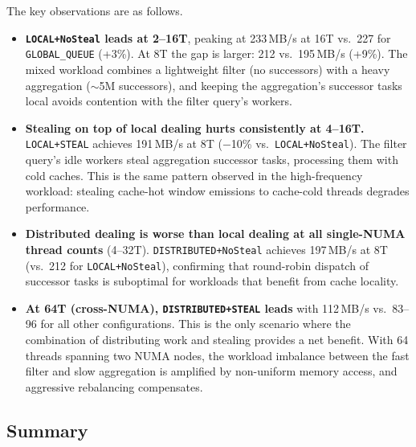 The key observations are as follows.
%
\begin{itemize}
    \item \textbf{\texttt{LOCAL+NoSteal} leads at 2--16T}, peaking at 233\,MB/s at 16T vs.\ 227 for \texttt{GLOBAL\_QUEUE} (+3\%).
    At 8T the gap is larger: 212 vs.\ 195\,MB/s (+9\%).
    The mixed workload combines a lightweight filter (no successors) with a heavy aggregation ($\sim$5M successors), and keeping the aggregation's successor tasks local avoids contention with the filter query's workers.

    \item \textbf{Stealing on top of local dealing hurts consistently at 4--16T.}
    \texttt{LOCAL+STEAL} achieves 191\,MB/s at 8T ($-$10\% vs.\ \texttt{LOCAL+NoSteal}).
    The filter query's idle workers steal aggregation successor tasks, processing them with cold caches.
    This is the same pattern observed in the high-frequency workload: stealing cache-hot window emissions to cache-cold threads degrades performance.

    \item \textbf{Distributed dealing is worse than local dealing at all single-NUMA thread counts} (4--32T).
    \texttt{DISTRIBUTED+NoSteal} achieves 197\,MB/s at 8T (vs.\ 212 for \texttt{LOCAL+NoSteal}), confirming that round-robin dispatch of successor tasks is suboptimal for workloads that benefit from cache locality.

    \item \textbf{At 64T (cross-NUMA), \texttt{DISTRIBUTED+STEAL} leads} with 112\,MB/s vs.\ 83--96 for all other configurations.
    This is the only scenario where the combination of distributing work and stealing provides a net benefit.
    With 64 threads spanning two NUMA nodes, the workload imbalance between the fast filter and slow aggregation is amplified by non-uniform memory access, and aggressive rebalancing compensates.
\end{itemize}

\subsection{Summary}

